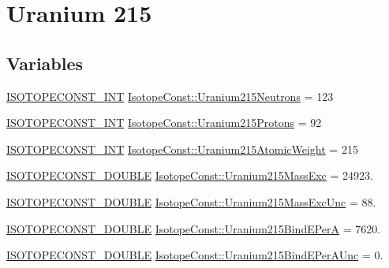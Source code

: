\hypertarget{group___isotope_const-_uranium-_u215}{}\section{Uranium 215}
\label{group___isotope_const-_uranium-_u215}
\subsection*{Variables}
\begin{DoxyCompactItemize}
\item 
\mbox{\hyperlink{group___isotope_const-_macros_ga5f18360b3e99483a35c32d789e62621c}{I\+S\+O\+T\+O\+P\+E\+C\+O\+N\+S\+T\+\_\+\+I\+NT}} \mbox{\hyperlink{group___isotope_const-_uranium-_u215_ga6d2c663ece3725042a0722a113801aa1}{Isotope\+Const\+::\+Uranium215\+Neutrons}} = 123
\item 
\mbox{\hyperlink{group___isotope_const-_macros_ga5f18360b3e99483a35c32d789e62621c}{I\+S\+O\+T\+O\+P\+E\+C\+O\+N\+S\+T\+\_\+\+I\+NT}} \mbox{\hyperlink{group___isotope_const-_uranium-_u215_gacc03f77995af6a4942425704db523d6a}{Isotope\+Const\+::\+Uranium215\+Protons}} = 92
\item 
\mbox{\hyperlink{group___isotope_const-_macros_ga5f18360b3e99483a35c32d789e62621c}{I\+S\+O\+T\+O\+P\+E\+C\+O\+N\+S\+T\+\_\+\+I\+NT}} \mbox{\hyperlink{group___isotope_const-_uranium-_u215_ga98cf1dead6606f5f448a1964975d4b2b}{Isotope\+Const\+::\+Uranium215\+Atomic\+Weight}} = 215
\item 
\mbox{\hyperlink{group___isotope_const-_macros_ga8f45a7272ce02c0b4c65c44636ed719a}{I\+S\+O\+T\+O\+P\+E\+C\+O\+N\+S\+T\+\_\+\+D\+O\+U\+B\+LE}} \mbox{\hyperlink{group___isotope_const-_uranium-_u215_gadf43dbbf9271d9ed17465ad190720ee0}{Isotope\+Const\+::\+Uranium215\+Mass\+Exc}} = 24923.
\item 
\mbox{\hyperlink{group___isotope_const-_macros_ga8f45a7272ce02c0b4c65c44636ed719a}{I\+S\+O\+T\+O\+P\+E\+C\+O\+N\+S\+T\+\_\+\+D\+O\+U\+B\+LE}} \mbox{\hyperlink{group___isotope_const-_uranium-_u215_ga2a7ebe19ca1ddc6736d67ba2a59fbd4a}{Isotope\+Const\+::\+Uranium215\+Mass\+Exc\+Unc}} = 88.
\item 
\mbox{\hyperlink{group___isotope_const-_macros_ga8f45a7272ce02c0b4c65c44636ed719a}{I\+S\+O\+T\+O\+P\+E\+C\+O\+N\+S\+T\+\_\+\+D\+O\+U\+B\+LE}} \mbox{\hyperlink{group___isotope_const-_uranium-_u215_ga5fe9482c2e828285f4fde998b9c6ed6f}{Isotope\+Const\+::\+Uranium215\+Bind\+E\+PerA}} = 7620.
\item 
\mbox{\hyperlink{group___isotope_const-_macros_ga8f45a7272ce02c0b4c65c44636ed719a}{I\+S\+O\+T\+O\+P\+E\+C\+O\+N\+S\+T\+\_\+\+D\+O\+U\+B\+LE}} \mbox{\hyperlink{group___isotope_const-_uranium-_u215_gab83f2f4a9ec2dba64aee0ac964f45c5f}{Isotope\+Const\+::\+Uranium215\+Bind\+E\+Per\+A\+Unc}} = 0.

\end{DoxyCompactItemize}
